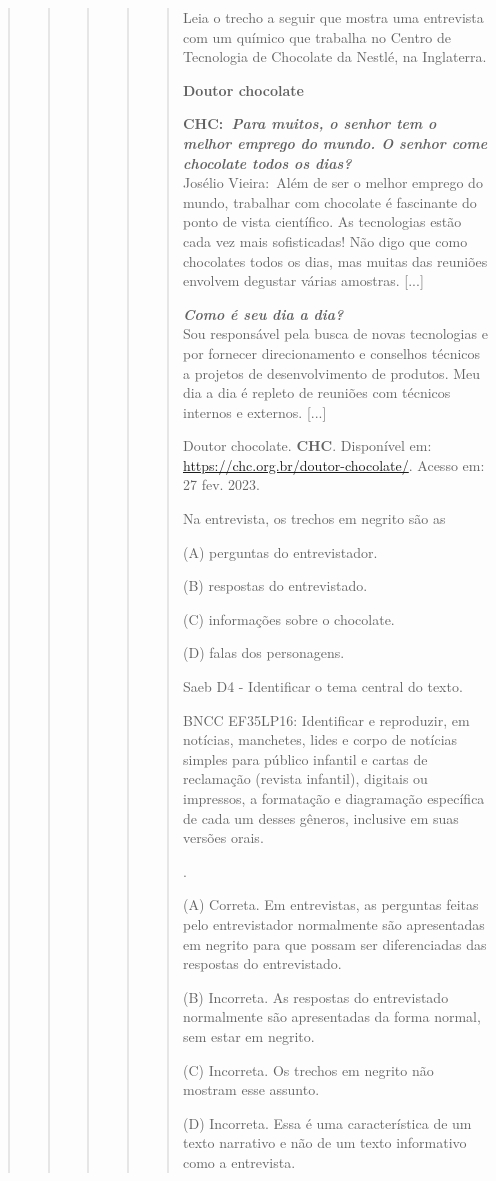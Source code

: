\begin{quote}
\begin{quote}
\begin{quote}
\begin{quote}
\begin{quote}
Leia o trecho a seguir que mostra uma entrevista com um químico que
trabalha no Centro de Tecnologia de Chocolate da Nestlé, na Inglaterra.

\textbf{Doutor chocolate}

\textbf{CHC:\emph{~Para muitos, o senhor tem o melhor emprego do mundo.
O senhor come chocolate todos os dias?}}\\
Josélio Vieira:~Além de ser o melhor emprego do mundo, trabalhar com
chocolate é fascinante do ponto de vista científico. As tecnologias
estão cada vez mais sofisticadas! Não digo que como chocolates todos os
dias, mas muitas das reuniões envolvem degustar várias amostras.
{[}...{]}

\emph{\textbf{Como é seu dia a dia?}}\\
Sou responsável pela busca de novas tecnologias e por fornecer
direcionamento e conselhos técnicos a projetos de desenvolvimento de
produtos. Meu dia a dia é repleto de reuniões com técnicos internos e
externos. {[}...{]}

Doutor chocolate. \textbf{CHC}. Disponível em:
\url{https://chc.org.br/doutor-chocolate/}. Acesso em: 27 fev. 2023.

Na entrevista, os trechos em negrito são as

(A) perguntas do entrevistador.

(B) respostas do entrevistado.

(C) informações sobre o chocolate.

(D) falas dos personagens.

Saeb D4 - Identificar o tema central do texto.

BNCC EF35LP16: Identificar e reproduzir, em notícias, manchetes, lides e
corpo de notícias simples para público infantil e cartas de reclamação
(revista infantil), digitais ou impressos, a formatação e diagramação
específica de cada um desses gêneros, inclusive em suas versões orais.

.

(A) Correta. Em entrevistas, as perguntas feitas pelo entrevistador
normalmente são apresentadas em negrito para que possam ser
diferenciadas das respostas do entrevistado.

(B) Incorreta. As respostas do entrevistado normalmente são apresentadas
da forma normal, sem estar em negrito.

(C) Incorreta. Os trechos em negrito não mostram esse assunto.

(D) Incorreta. Essa é uma característica de um texto narrativo e não de
um texto informativo como a entrevista.
\end{quote}


\end{quote}
\end{quote}
\end{quote}
\end{quote}
